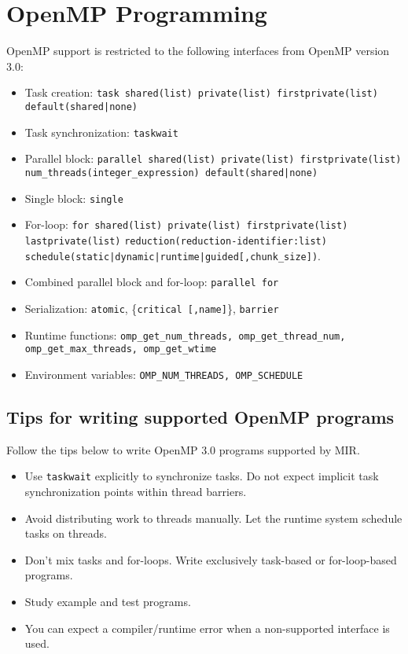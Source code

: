 \documentclass[11pt,a4paper]{article}
\begin{document}
\section{OpenMP Programming}\label{sec:openmp-programming}

OpenMP support is restricted to the following interfaces from OpenMP version 3.0:

\begin{itemize}
    \item Task creation: \texttt{task shared(list) private(list) firstprivate(list) default(shared|none)}
    \item Task synchronization: \texttt{taskwait}
    \item Parallel block: \texttt{parallel shared(list) private(list) firstprivate(list) num\_threads(integer\_expression) default(shared|none)}
    \item Single block: \texttt{single}
    \item For-loop: \texttt{for shared(list) private(list) firstprivate(list) lastprivate(list)} \texttt{reduction(reduction-identifier:list)} \\ \texttt{schedule(static|dynamic|runtime|guided[,chunk\_size])}.
    \item Combined parallel block and for-loop: \texttt{parallel for}
    \item Serialization: \texttt{atomic}, \{\texttt{critical [,name]}\}, \texttt{barrier}
    \item Runtime functions: \texttt{omp\_get\_num\_threads, omp\_get\_thread\_num, \\omp\_get\_max\_threads, omp\_get\_wtime}
    \item Environment variables: \texttt{OMP\_NUM\_THREADS, OMP\_SCHEDULE}
\end{itemize}

\subsection{Tips for writing supported OpenMP programs}\label{sec:tips-for-writing-mir-supported-openmp-programs}

Follow the tips below to write OpenMP 3.0 programs supported by MIR.

\begin{itemize}
    \item Use \texttt{taskwait} explicitly to synchronize tasks. Do not expect implicit task synchronization points within thread barriers.
        \item Avoid distributing work to threads manually. Let the runtime system schedule tasks on threads.
        \item Don't mix tasks and for-loops. Write exclusively task-based or for-loop-based programs.
        \item Study example and test programs.
        \item You can expect a compiler/runtime error when a non-supported interface is used.
\end{itemize}
\end{document}
